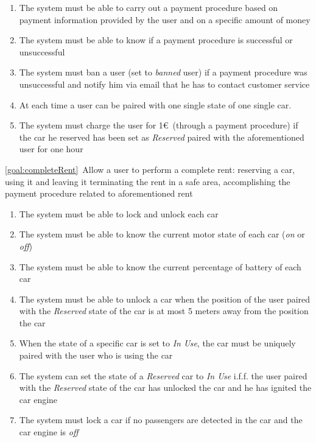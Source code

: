 \begin{description}
  			\begin{enumerate}[resume*]
  				\item The system must be able to carry out a payment procedure based on payment
  				information provided by the user and on a specific amount of money
  				\item The system must be able to know if a payment procedure is successful or
  				unsuccessful
  				\item The system must ban a user (set to \emph{banned} user) if a
  				payment procedure was unsuccessful and notify him via email that he has to
  				contact customer service
  				\item At each time a user can be paired with one single state of one single car.
  				\item The system must charge the user for 1\euro\ (through a payment procedure) if
  				the car he reserved has been set as \emph{Reserved} paired with the aforementioned
  				user for one hour
   			\end{enumerate}
  		\item \ref{goal:completeRent}\ Allow a user to perform a complete rent: reserving a car, using it and leaving it terminating the rent in a safe area, accomplishing the payment procedure related to aforementioned rent
  			\begin{enumerate}[resume*]
  				\item The system must be able to lock and unlock each car
  				\item The system must be able to know the current motor state of each car
  				(\emph{on} or \emph{off})
  				\item The system must be able to know the current percentage of battery of each car
  				\item The system must be able to unlock a car when the position of the user paired
  				with the
  				\emph{Reserved} state of the car is at most 5 meters away from the position the car
  				\item When the state of a specific car is set to \emph{In Use}, the car must be
 	  			uniquely paired with the user who is using the car
  				\item The system can set the state of a \emph{Reserved} car to \emph{In Use} i.f.f.
  				the user paired with the \emph{Reserved} state of the car has unlocked the car and he
  				has ignited the car engine
  				\item The system must lock a car if no passengers are detected in the car and the car
  				engine is \emph{off}

\end{enumerate}
\end{description}
